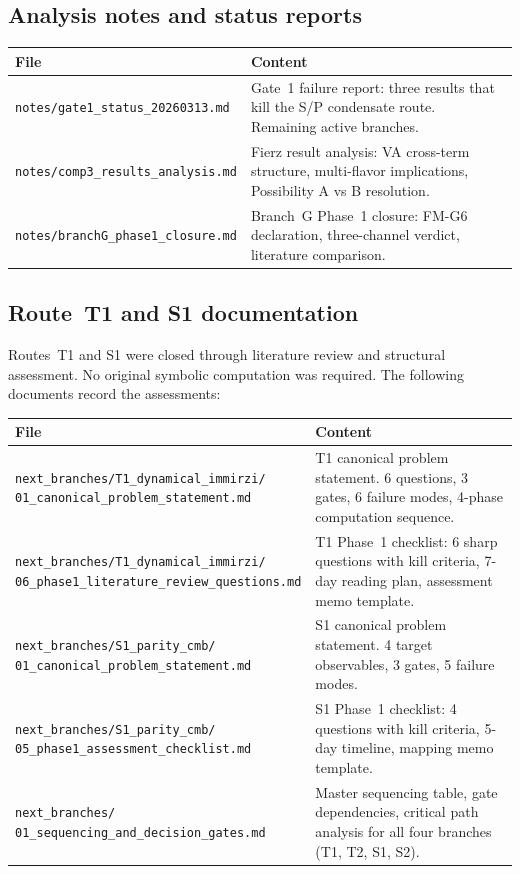 \documentclass[11pt,letterpaper]{article}
\begin{document}
\subsection{Analysis notes and status reports}

\begin{longtable}{@{}p{}p{}@{}}
\toprule
File & Content \\
\midrule
\texttt{notes/gate1\_status\_20260313.md} &
  Gate~1 failure report: three results that kill the S/P condensate
  route. Remaining active branches. \\
\texttt{notes/comp3\_results\_analysis.md} &
  Fierz result analysis: VA cross-term structure, multi-flavor
  implications, Possibility A vs B resolution. \\
\texttt{notes/branchG\_phase1\_closure.md} &
  Branch~G Phase~1 closure: FM-G6 declaration, three-channel
  verdict, literature comparison. \\
\bottomrule
\end{longtable}

\subsection{Route~T1 and S1 documentation}

Routes~T1 and S1 were closed through literature review and structural
assessment. No original symbolic computation was required. The following
documents record the assessments:

\begin{longtable}{@{}p{}p{}@{}}
\toprule
File & Content \\
\midrule
\texttt{next\_branches/T1\_dynamical\_immirzi/\newline
01\_canonical\_problem\_statement.md} &
  T1 canonical problem statement. 6 questions, 3 gates, 6 failure modes,
  4-phase computation sequence. \\
\texttt{next\_branches/T1\_dynamical\_immirzi/\newline
06\_phase1\_literature\_review\_questions.md} &
  T1 Phase~1 checklist: 6 sharp questions with kill criteria, 7-day reading
  plan, assessment memo template. \\
\texttt{next\_branches/S1\_parity\_cmb/\newline
01\_canonical\_problem\_statement.md} &
  S1 canonical problem statement. 4 target observables, 3 gates, 5 failure
  modes. \\
\texttt{next\_branches/S1\_parity\_cmb/\newline
05\_phase1\_assessment\_checklist.md} &
  S1 Phase~1 checklist: 4 questions with kill criteria, 5-day timeline,
  mapping memo template. \\
\texttt{next\_branches/\newline
01\_sequencing\_and\_decision\_gates.md} &
  Master sequencing table, gate dependencies, critical path analysis for
  all four branches (T1, T2, S1, S2). \\
\bottomrule
\end{longtable}
\end{document}
